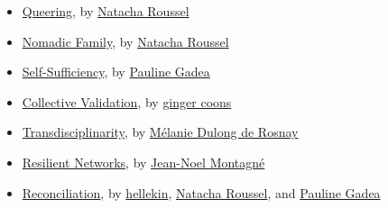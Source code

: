 \begin{itemize}
\tightlist
\item
  \href{queering.html}{Queering}, by
  \href{../appendix/attributions.html\#natacha-roussel}{Natacha Roussel}
\item
  \href{nomadic-family.html}{Nomadic Family}, by
  \href{../appendix/attributions.html\#natacha-roussel}{Natacha Roussel}
\item
  \href{self-sufficiency.html}{Self-Sufficiency}, by
  \href{../appendix/attributions.html\#pauline-gadea}{Pauline Gadea}
\item
  \href{collective-validation.html}{Collective Validation}, by
  \href{../appendix/attributions.html\#ginger-coons}{ginger coons}
\item
  \href{transdisciplinarity.html}{Transdisciplinarity}, by
  \href{../appendix/attributions.html\#melanie-dulong-de-rosnay}{Mélanie
  Dulong de Rosnay}
\item
  \href{resilient-networks.html}{Resilient Networks}, by
  \href{../appendix/attributions.html\#jean-noel-montagne}{Jean-Noel
  Montagné}
\item
  \href{reconciliation.html}{Reconciliation}, by
  \href{../appendix/attributions.html\#hellekin}{hellekin},
  \href{../appendix/attributions.html\#natacha-roussel}{Natacha
  Roussel}, and
  \href{../appendix/attributions.html\#pauline-gadea}{Pauline Gadea}
\end{itemize}
